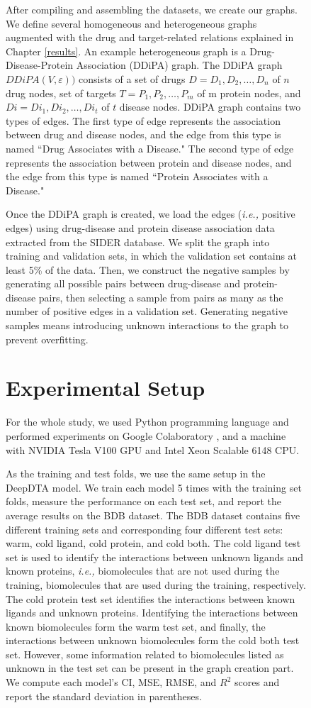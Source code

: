 \begin{figure}[h]
After compiling and assembling the datasets, we create our graphs. We define several homogeneous and heterogeneous graphs augmented with the drug and target-related relations explained in Chapter \ref{results}. An example heterogeneous graph is a Drug-Disease-Protein Association (DDiPA) graph. The DDiPA graph $DDiPA(V,\varepsilon))$ consists of a set of drugs $D = {D_1, D_2, …, D_n}$ of $n$ drug nodes, set of targets $T = {P_1, P_2, …, P_m}$ of m protein nodes, and $Di = {Di_1, Di_2, …, Di_t}$ of $t$ disease nodes. DDiPA graph contains two types of edges. The first type of edge represents the association between drug and disease nodes, and the edge from this type is named ``Drug Associates with a Disease." The second type of edge represents the association between protein and disease nodes, and the edge from this type is named ``Protein Associates with a Disease." 

Once the DDiPA graph is created, we load the edges (\textit{i.e.,} positive edges) using drug-disease and protein disease association data extracted from the SIDER database. We split the graph into training and validation sets, in which the validation set contains at least 5\% of the data. Then, we construct the negative samples by generating all possible pairs between drug-disease and protein-disease pairs, then selecting a sample from pairs as many as the number of positive edges in a validation set. Generating negative samples means introducing unknown interactions to the graph to prevent overfitting.

\section{Experimental Setup}
For the whole study, we used Python programming language and performed experiments on Google Colaboratory \cite{carneiro2018performance}, and a machine with NVIDIA Tesla V100 GPU and Intel Xeon Scalable 6148 CPU.

As the training and test folds, we use the same setup in the DeepDTA model. We train each model 5 times with the training set folds, measure the performance on each test set, and report the average results on the BDB dataset. The BDB dataset contains five different training sets and corresponding four different test sets: warm, cold ligand, cold protein, and cold both. The cold ligand test set is used to identify the interactions between unknown ligands and known proteins, \textit{i.e.,} biomolecules that are not used during the training, biomolecules that are used during the training, respectively. The cold protein test set identifies the interactions between known ligands and unknown proteins. Identifying the interactions between known biomolecules form the warm test set, and finally, the interactions between unknown biomolecules form the cold both test set. However, some information related to biomolecules listed as unknown in the test set can be present in the graph creation part. We compute each model's CI, MSE, RMSE, and $R^2$ scores and report the standard deviation in parentheses.


\end{figure}
